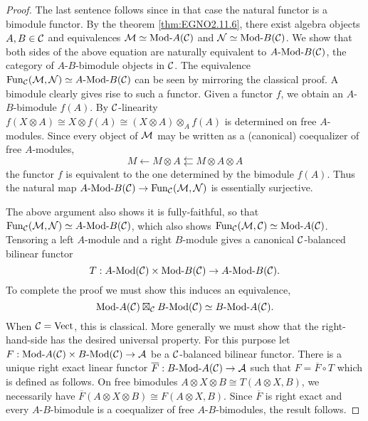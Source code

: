 \documentclass{amsart}
\begin{document}
\begin{proof}
	The last sentence follows since in that case the natural functor is a bimodule functor. By the theorem \ref{thm:EGNO2.11.6}, there exist algebra objects $A, B \in \mathcal C$ and equivalences $\cM \simeq \Mod{}{A}(\cC)$ and $\cN \simeq \Mod{}{B}(\cC)$. We show that both sides of the above equation are naturally equivalent to $\Mod{A}{B}(\cC)$, the category of $A$-$B$-bimodule objects in $\mathcal C$. The equivalence $\Fun_\cC(\cM, \cN) \simeq \Mod{A}{B}(\cC)$ can be seen by mirroring the classical proof. A bimodule clearly gives rise to such a functor. Given a functor $f$, we obtain an $A$-$B$-bimodule $f(A)$. By $\mathcal C$-linearity $f(X \otimes A) \cong X \otimes f(A)  \cong (X \otimes A) \otimes_A f(A) $ is determined on free $A$-modules. Since every object of $\mathcal M$ may be written as a (canonical) coequalizer of free $A$-modules,
	\begin{equation*}
		M \leftarrow M \otimes A \leftleftarrows M \otimes A \otimes A
	\end{equation*} 
the functor $f$ is equivalent to the one determined by the bimodule $f(A)$. Thus the natural map  $\Mod{A}{B}(\cC) \to \Fun_\cC(\cM, \cN)$ is essentially surjective. 

The above argument also shows it is fully-faithful, so that $\Fun_\cC(\cM, \cN) \simeq \Mod{A}{B}(\cC)$, which also shows $\Fun_\cC(\cM, \cC) \simeq \Mod{}{A}(\cC)$. Tensoring a left $A$-module and a right $B$-module gives a canonical $\mathcal C$-balanced bilinear functor 
\begin{equation*}
	T: \Mod{A}{}(\cC) \times \Mod{}{B}(\cC) \to \Mod{A}{B}(\cC). 
\end{equation*}
To complete the proof we must show this induces an equivalence,
\begin{equation*}
	\Mod{}{A}(\cC) \boxtimes_\cC \Mod{B}{}(\cC) \simeq \Mod{B}{A}(\cC).
\end{equation*}
When $\mathcal C = \mathrm{Vect}$, this is classical. More generally we must show that the right-hand-side has the desired universal property. For this purpose let $F:\Mod{}{A}(\cC) \times \Mod{B}{}(\cC) \to \cA$ be a $\mathcal C$-balanced bilinear functor. There is a unique right exact linear functor $\overline F: \Mod{B}{A}(\cC) \to \cA$ such that $F = \overline{F} \circ T$ which is defined as follows. On free bimodules $A \otimes X \otimes B \cong T(A \otimes X, B)$, we necessarily have $\overline{F}(A \otimes X \otimes B) \cong F(A \otimes X, B)$. Since $\overline{F}$ is right exact and every $A$-$B$-bimodule is a coequalizer of free $A$-$B$-bimodules, the result follows. 	
\end{proof}
\end{document}
